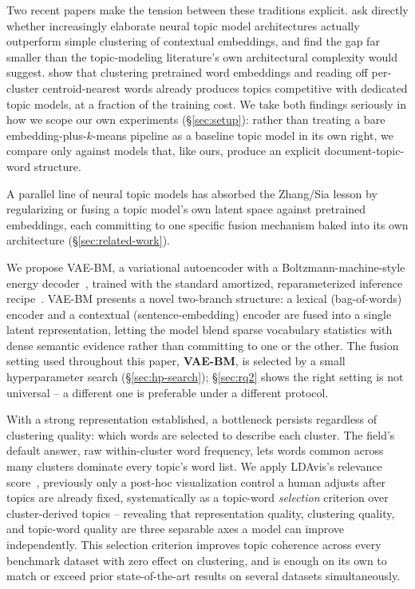 \documentclass[11pt]{article}
\begin{document}
Two recent papers make the tension between these traditions explicit. \citet{zhang2022neuraltopicclustering} ask directly whether increasingly elaborate neural topic model architectures actually outperform simple clustering of contextual embeddings, and find the gap far smaller than the topic-modeling literature's own architectural complexity would suggest. \citet{sia2020tired} show that clustering pretrained word embeddings and reading off per-cluster centroid-nearest words already produces topics competitive with dedicated topic models, at a fraction of the training cost. We take both findings seriously in how we scope our own experiments (\S\ref{sec:setup}): rather than treating a bare embedding-plus-$k$-means pipeline as a baseline topic model in its own right, we compare only against models that, like ours, produce an explicit document-topic-word structure.

A parallel line of neural topic models has absorbed the Zhang/Sia lesson by regularizing or fusing a topic model's own latent space against pretrained embeddings, each committing to one specific fusion mechanism baked into its own architecture (\S\ref{sec:related-work}).

We propose VAE-BM, a variational autoencoder with a Boltzmann-machine-style energy decoder~\citep{dahl2012rbm}, trained with the standard amortized, reparameterized inference recipe~\citep{kingma2014autoencoding,rezende2014stochastic}. VAE-BM presents a novel two-branch structure: a lexical (bag-of-words) encoder and a contextual (sentence-embedding) encoder are fused into a single latent representation, letting the model blend sparse vocabulary statistics with dense semantic evidence rather than committing to one or the other. The fusion setting used throughout this paper, \textbf{VAE-BM}, is selected by a small hyperparameter search (\S\ref{sec:hp-search}); \S\ref{sec:rq2} shows the right setting is not universal -- a different one is preferable under a different protocol.

With a strong representation established, a bottleneck persists regardless of clustering quality: which words are selected to describe each cluster. The field's default answer, raw within-cluster word frequency, lets words common across many clusters dominate every topic's word list. We apply LDAvis's relevance score~\citep{sievert2014ldavis}, previously only a post-hoc visualization control a human adjusts after topics are already fixed, systematically as a topic-word \emph{selection} criterion over cluster-derived topics -- revealing that representation quality, clustering quality, and topic-word quality are three separable axes a model can improve independently. This selection criterion improves topic coherence across every benchmark dataset with zero effect on clustering, and is enough on its own to match or exceed prior state-of-the-art results on several datasets simultaneously.
\end{document}
